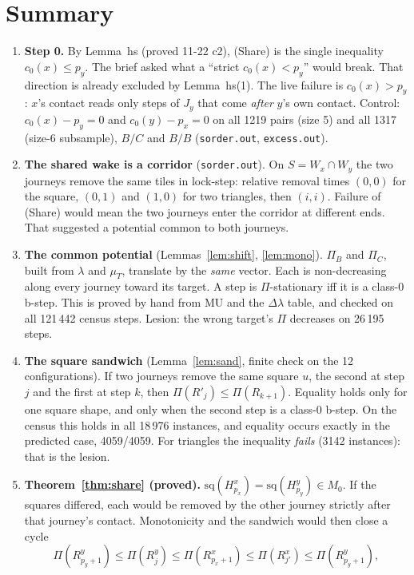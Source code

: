 \documentclass[11pt]{article}
\theoremstyle{definition}\newtheorem{definition}[theorem]{Definition}\newtheorem{remark}[theorem]{Remark}
\begin{document}
\section*{Summary}
\begin{enumerate}
\item \textbf{Step 0.} By Lemma~hs (proved 11-22 c2), (Share) is the single inequality $c_0(x)\le p_y$. The brief asked what a ``strict $c_0(x)<p_y$'' would break. That direction is already excluded by Lemma~hs(1). The live failure is $c_0(x)>p_y$: $x$'s contact reads only steps of $J_y$ that come \emph{after} $y$'s own contact. Control: $c_0(x)-p_y=0$ and $c_0(y)-p_x=0$ on all 1219 pairs (size 5) and all 1317 (size-6 subsample), $B/C$ and $B/B$ (\texttt{sorder.out}, \texttt{excess.out}).
\item \textbf{The shared wake is a corridor} (\texttt{sorder.out}). On $S=W_x\cap W_y$ the two journeys remove the same tiles in lock-step: relative removal times $(0,0)$ for the square, $(0,1)$ and $(1,0)$ for two triangles, then $(i,i)$. Failure of (Share) would mean the two journeys enter the corridor at different ends. That suggested a potential common to both journeys.
\item \textbf{The common potential} (Lemmas~\ref{lem:shift}, \ref{lem:mono}). $\Pi_B$ and $\Pi_C$, built from $\lambda$ and $\mu_T$, translate by the \emph{same} vector. Each is non-decreasing along every journey toward its target. A step is $\Pi$-stationary iff it is a class-0 b-step. This is proved by hand from MU and the $\Delta\lambda$ table, and checked on all 121\,442 census steps. Lesion: the wrong target's $\Pi$ decreases on 26\,195 steps.
\item \textbf{The square sandwich} (Lemma~\ref{lem:sand}, finite check on the 12 configurations). If two journeys remove the same square $u$, the second at step $j$ and the first at step $k$, then $\Pi(R'_j)\le\Pi(R_{k+1})$. Equality holds only for one square shape, and only when the second step is a class-0 b-step. On the census this holds in all 18\,976 instances, and equality occurs exactly in the predicted case, 4059/4059. For triangles the inequality \emph{fails} (3142 instances): that is the lesion.
\item \textbf{Theorem~\ref{thm:share} (proved).} $\mathrm{sq}(H^x_{p_x})=\mathrm{sq}(H^y_{p_y})\in M_0$. If the squares differed, each would be removed by the other journey strictly after that journey's contact. Monotonicity and the sandwich would then close a cycle
\[\Pi(R^y_{p_y+1})\le\Pi(R^y_j)\le\Pi(R^x_{p_x+1})\le\Pi(R^x_{j'})\le\Pi(R^y_{p_y+1}),\]

\end{enumerate}
\end{document}
